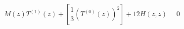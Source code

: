 \begin{equation}
M(z) T^{(1)}(z) +[\frac{1}{3} (T^{(0)}(z))^2] +12 H(z,z)=0
\label{t1t2}
\end{equation}

